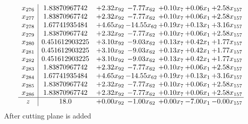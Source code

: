 \documentclass[8pt]{article}
\begin{document}
\[\begin{array}{c| c c@{\hskip 2pt} c@{\hskip 2pt} c@{\hskip 2pt} c@{\hskip 2pt} c@{\hskip 2pt} }
 x_{276}   &  1.83870967742 & +  2.32 x_{92} & -7.77 x_{62} & +  0.10 x_{7} & +  0.06 x_{1} & +  2.58 x_{157}\\
 x_{277}   &  1.83870967742 & +  2.32 x_{92} & -7.77 x_{62} & +  0.10 x_{7} & +  0.06 x_{1} & +  2.58 x_{157}\\
 x_{278}   &  1.67741935484 & +  4.65 x_{92} & -14.55 x_{62} & +  0.19 x_{7} & +  0.13 x_{1} & +  3.16 x_{157}\\
 x_{279}   &  1.83870967742 & +  2.32 x_{92} & -7.77 x_{62} & +  0.10 x_{7} & +  0.06 x_{1} & +  2.58 x_{157}\\
 x_{280}   &  0.451612903225 & +  3.10 x_{92} & -9.03 x_{62} & +  0.13 x_{7} & +  0.42 x_{1} & +  1.77 x_{157}\\
 x_{281}   &  0.451612903225 & +  3.10 x_{92} & -9.03 x_{62} & +  0.13 x_{7} & +  0.42 x_{1} & +  1.77 x_{157}\\
 x_{282}   &  0.451612903225 & +  3.10 x_{92} & -9.03 x_{62} & +  0.13 x_{7} & +  0.42 x_{1} & +  1.77 x_{157}\\
 x_{283}   &  1.83870967742 & +  2.32 x_{92} & -7.77 x_{62} & +  0.10 x_{7} & +  0.06 x_{1} & +  2.58 x_{157}\\
 x_{284}   &  1.67741935484 & +  4.65 x_{92} & -14.55 x_{62} & +  0.19 x_{7} & +  0.13 x_{1} & +  3.16 x_{157}\\
 x_{285}   &  1.83870967742 & +  2.32 x_{92} & -7.77 x_{62} & +  0.10 x_{7} & +  0.06 x_{1} & +  2.58 x_{157}\\
 x_{286}   &  1.83870967742 & +  2.32 x_{92} & -7.77 x_{62} & +  0.10 x_{7} & +  0.06 x_{1} & +  2.58 x_{157}\\
\hline
z    &  18.0 & +  0.00 x_{92} & -1.00 x_{62} & +  0.00 x_{7} & -7.00 x_{1} & -0.00 x_{157}\\
\end{array}\]
 After cutting plane is added 
\end{document}
